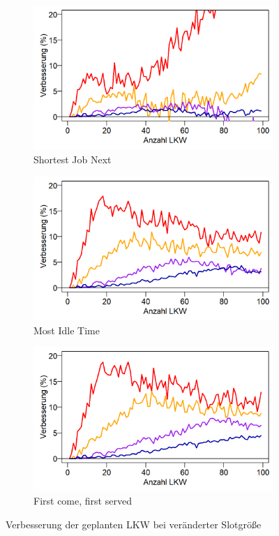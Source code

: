 \begin{figure}[H]
\centering
\begin{subfigure}{.495\textwidth}
  \centering
  \includegraphics[width=\linewidth]{images/graphs/rsSlotsizeSjn.png}
  \caption{Shortest Job Next}
  \label{fig:eof1}
\end{subfigure}
\begin{subfigure}{.495\textwidth}
  \centering
  \includegraphics[width=\linewidth]{images/graphs/rsSlotsizeMit.png}
  \caption{Most Idle Time}
  \label{fig:eof2}
\end{subfigure}

\begin{subfigure}{.5\textwidth}
  \centering
  \includegraphics[width=\linewidth]{images/graphs/rsSlotsizeFcfs.png}
  \caption{First come, first served}
  \label{fig:eof3}
\end{subfigure}
\caption{Verbesserung der geplanten LKW bei veränderter Slotgröße}
\label{fig:evalSlotsize}
\end{figure}
